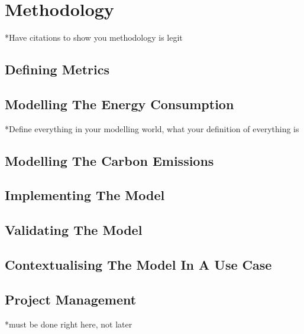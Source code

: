\chapter {Methodology}
*Have citations to show you methodology is legit

\section {Defining Metrics}

\section {Modelling The Energy Consumption}

*Define everything in your modelling world, what your definition of everything is

\section {Modelling The Carbon Emissions }
\section {Implementing The Model}
\section {Validating The Model}
\section {Contextualising The Model In A Use Case}
\section {Project Management}
*must be done right here, not later
